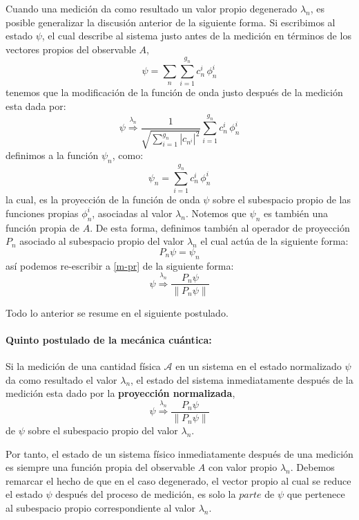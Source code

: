 \documentclass[12pt]{book}
\numberwithin{equation}{chapter}
\begin{document}
Cuando una medici\'on da como resultado un valor propio degenerado $\lambda_{n}$, es posible generalizar la discusi\'on anterior de la siguiente forma. Si escribimos al estado $\psi$, el cual describe al sistema justo antes de la medici\'on en t\'erminos de los vectores propios del observable $A$, 
$$ \psi = \sum_{n} \sum_{i=1}^{g_{n}} c_{n}^{i}\, \phi_{n}^{i} $$
tenemos que la modificaci\'on de la funci\'on de onda justo despu\'es de la medici\'on esta dada por:
\begin{equation}\label{m-pr}
\psi \overset{ \lambda_{n} }{\Rightarrow} \frac{1}{ \sqrt{ \sum_{i=1}^{g_{n}} |c_{n^{i}}|^{2}} } \sum_{i=1}^{g_{n}} c_{n}^{i}\, \phi_{n}^{i} 
\end{equation}
definimos a la funci\'on $\psi_{n}$, como:
$$ \psi_{n}= \sum_{i=1}^{g_{n}} c_{n}^{i}\, \phi_{n}^{i} $$
la cual, es la proyecci\'on de la funci\'on de onda $\psi$ sobre el subespacio propio de las funciones propias $\phi_{n}^{i}$, asociadas al valor $\lambda_{n}$. Notemos que $\psi_{n}$ es tambi\'en una funci\'on propia de $A$. De esta forma, definimos tambi\'en al operador de proyecci\'on $P_{n}$ asociado al subespacio propio del valor $\lambda_{n}$ el cual act\'ua de la siguiente forma:
$$  P_{n} \psi =\psi_{n} $$ 
as\'i podemos re-escribir a \eqref{m-pr} de la siguiente forma:
\begin{equation}
\psi \overset{ \lambda_{n} }{\Rightarrow} \frac{P_{n} \psi}{\| P_{n}\psi \|} 
\end{equation}

Todo lo anterior se resume en el siguiente postulado.

\paragraph{Quinto postulado de la mec\'anica cu\'antica:}
Si la medici\'on de una cantidad f\'isica $\mathcal{A}$ en un sistema en el estado normalizado $\psi$ da como resultado el valor $\lambda_{n}$, el estado del sistema inmediatamente despu\'es de la medici\'on esta dado por la {\bf proyecci\'on normalizada},
\begin{equation}
\psi \overset{ \lambda_{n} }{\Rightarrow} \frac{P_{n} \psi}{\| P_{n}\psi \|}
\end{equation}
de $\psi$ sobre el subespacio propio del valor $\lambda_{n}$.\\
\rightline{$\dag$}
\vspace{2 mm}

Por tanto, el estado de un sistema f\'isico inmediatamente despu\'es de una medici\'on es siempre una funci\'on propia del observable $A$ con valor propio $\lambda_{n}$. Debemos remarcar el hecho de que en el caso degenerado, el vector propio al cual se reduce el estado $\psi$ despu\'es del proceso de medici\'on, es solo la $parte$ de $\psi$ que pertenece al subespacio propio correspondiente al valor $\lambda_{n}$.\\
\end{document}
